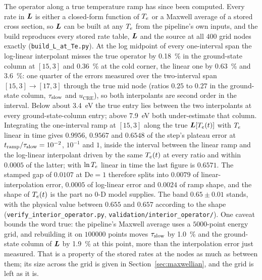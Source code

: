 The operator along a true temperature ramp has since been computed. Every
rate in $\bm{L}$ is either a closed-form function of $T_e$ or a Maxwell
average of a stored cross section, so $\bm{L}$ can be built at any $T_e$ from
the pipeline's own inputs, and the build reproduces every stored rate table,
$\bm{L}$ and the source at all $400$ grid nodes exactly
(\texttt{build\_L\_at\_Te.py}). At the log midpoint of every one-interval
span the log-linear interpolant misses the true operator by
\SI{0.18}{\percent} in the ground-state column at $[15,3]$ and
\SI{0.36}{\percent} at the cold corner, the linear one by \SI{0.63}{\percent}
and \SI{3.6}{\percent}: one quarter of the errors measured over the
two-interval span $[15,3]\to[17,3]$ through the true mid node (ratios $0.25$
to $0.27$ in the ground-state column, $\tau_{\mathrm{slow}}$ and $u_{\mathrm{CRE}}$), so
both interpolants are second order in the interval. Below about
\SI{3.4}{\electronvolt} the true entry lies between the two interpolants at
every ground-state-column entry; above \SI{7.9}{\electronvolt} both
under-estimate that column. Integrating the one-interval ramp at $[15,3]$
along the true $\bm{L}[T_e(t)]$ with $T_e$ linear in time gives $0.9956$,
$0.9567$ and $0.6548$ of the step's plateau error at
$t_{\mathrm{ramp}}/\tau_{\mathrm{slow}} = 10^{-2}$, $10^{-1}$ and $1$, inside the
interval between the linear ramp and the log-linear interpolant driven by the
same $T_e(t)$ at every ratio and within $0.0005$ of the latter; with $\ln T_e$
linear in time the last figure is $0.6571$. The stamped gap of $0.0107$ at
$\mathrm{De}=1$ therefore splits into $0.0079$ of linear-interpolation error,
$0.0005$ of log-linear error and $0.0024$ of ramp shape, and the shape of
$T_e(t)$ is the part no 0-D model supplies. The band $0.65\pm0.01$ stands,
with the physical value between $0.655$ and $0.657$ according to the shape
(\texttt{verify\_interior\_operator.py},
\texttt{validation/interior\_operator/}). One caveat bounds the word true:
the pipeline's Maxwell average uses a $5000$-point energy grid, and
rebuilding it on $100000$ points moves $\tau_{\mathrm{slow}}$ by \SI{1.0}{\percent} and
the ground-state column of $\bm{L}$ by \SI{1.9}{\percent} at this point, more
than the interpolation error just measured. That is a property of the stored
rates at the nodes as much as between them; its size across the grid is
given in Section~\ref{sec:maxwellian}, and the grid is left as it is.

